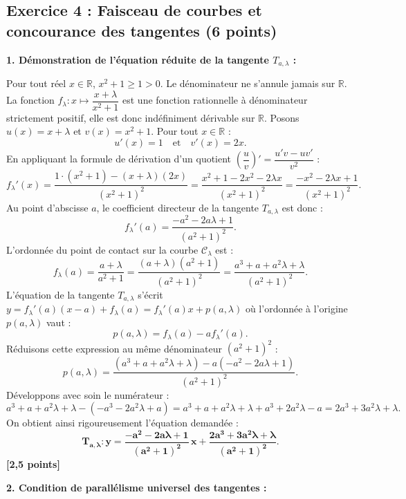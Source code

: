 \documentclass[11pt,a4paper]{article}
\newcommand{\R}{\mathbb{R}}
\begin{document}
\subsection*{Exercice 4 : Faisceau de courbes et concourance des tangentes \hfill \normalfont\normalsize (6 points)}

\begin{correctionbox}
\textbf{1. Démonstration de l'équation réduite de la tangente $T_{a,\lambda}$ :}

Pour tout réel $x \in \R$, $x^2 + 1 \ge 1 > 0$. Le dénominateur ne s'annule jamais sur $\R$.
La fonction $f_\lambda : x \mapsto \dfrac{x + \lambda}{x^2 + 1}$ est une fonction rationnelle à dénominateur strictement positif, elle est donc indéfiniment dérivable sur $\R$.
Posons $u(x) = x + \lambda$ et $v(x) = x^2 + 1$. Pour tout $x \in \R$ :
\[
u'(x) = 1 \quad \text{et} \quad v'(x) = 2x.
\]
En appliquant la formule de dérivation d'un quotient $\left(\dfrac{u}{v}\right)' = \dfrac{u'v - uv'}{v^2}$ :
\[
f_\lambda'(x) = \frac{1 \cdot (x^2 + 1) - (x + \lambda)(2x)}{(x^2 + 1)^2} = \frac{x^2 + 1 - 2x^2 - 2\lambda x}{(x^2 + 1)^2} = \frac{-x^2 - 2\lambda x + 1}{(x^2 + 1)^2}.
\]
Au point d'abscisse $a$, le coefficient directeur de la tangente $T_{a,\lambda}$ est donc :
\[
f_\lambda'(a) = \frac{-a^2 - 2a\lambda + 1}{(a^2 + 1)^2}.
\]
L'ordonnée du point de contact sur la courbe $\mathcal{C}_\lambda$ est :
\[
f_\lambda(a) = \frac{a + \lambda}{a^2 + 1} = \frac{(a + \lambda)(a^2 + 1)}{(a^2 + 1)^2} = \frac{a^3 + a + a^2\lambda + \lambda}{(a^2 + 1)^2}.
\]
L'équation de la tangente $T_{a,\lambda}$ s'écrit $y = f_\lambda'(a)(x - a) + f_\lambda(a) = f_\lambda'(a)x + p(a,\lambda)$ où l'ordonnée à l'origine $p(a,\lambda)$ vaut :
\[
p(a,\lambda) = f_\lambda(a) - a f_\lambda'(a).
\]
Réduisons cette expression au même dénominateur $(a^2 + 1)^2$ :
\[
p(a,\lambda) = \frac{(a^3 + a + a^2\lambda + \lambda) - a(-a^2 - 2a\lambda + 1)}{(a^2 + 1)^2}.
\]
Développons avec soin le numérateur :
\[
a^3 + a + a^2\lambda + \lambda - (-a^3 - 2a^2\lambda + a) = a^3 + a + a^2\lambda + \lambda + a^3 + 2a^2\lambda - a = 2a^3 + 3a^2\lambda + \lambda.
\]
On obtient ainsi rigoureusement l'équation demandée :
\[
\mathbf{T_{a,\lambda} : y = \frac{-a^2 - 2a\lambda + 1}{(a^2 + 1)^2} \, x + \frac{2a^3 + 3a^2\lambda + \lambda}{(a^2 + 1)^2}}.
\] \hfill \textbf{[2{,}5 points]}

\medskip
\textbf{2. Condition de parallélisme universel des tangentes :}


\end{correctionbox}
\end{document}

